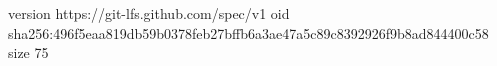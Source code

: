 version https://git-lfs.github.com/spec/v1
oid sha256:496f5eaa819db59b0378feb27bffb6a3ae47a5c89c8392926f9b8ad844400c58
size 75
